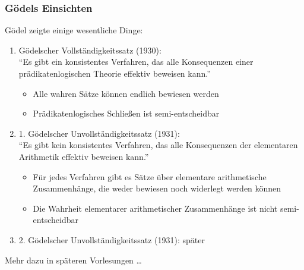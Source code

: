 \documentclass[onlymath]{beamer}
\begin{document}
\begin{frame}\frametitle{Gödels Einsichten}

Gödel zeigte einige wesentliche Dinge:
\begin{enumerate}[(1)]
\item \alert{Gödelscher Vollständigkeitssatz (1930):}\\
"`Es gibt ein konsistentes Verfahren, das alle Konsequenzen einer prädikatenlogischen Theorie
effektiv beweisen kann."'
\begin{itemize}
\item Alle wahren Sätze können endlich bewiesen werden
\item Prädikatenlogisches Schließen ist semi-entscheidbar
\end{itemize}\pause
%
\item \alert{1. Gödelscher Unvollständigkeitssatz (1931):} \\
"`Es gibt kein konsistentes Verfahren, das alle Konsequenzen der elementaren Arithmetik
effektiv beweisen kann."'
\begin{itemize}
\item Für jedes Verfahren gibt es Sätze über elementare arithmetische Zusammenhänge, die weder bewiesen noch
widerlegt werden können
\item Die Wahrheit elementarer arithmetischer Zusammenhänge ist nicht semi-entscheidbar
\end{itemize}\pause
\item \alert{2. Gödelscher Unvollständigkeitssatz (1931):} später
\end{enumerate}

Mehr dazu in späteren Vorlesungen \ldots

\end{frame}

\end{document}
